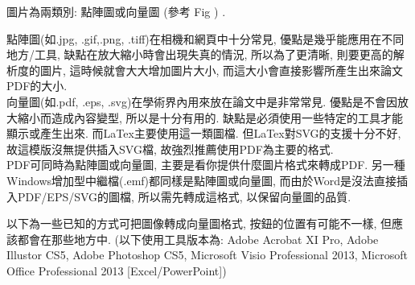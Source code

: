 

圖片為兩類別: 點陣圖或向量圖 (參考 Fig ) .\\


點陣圖(如.jpg, .gif,.png, .tiff)在相機和網頁中十分常見, 優點是幾乎能應用在不同地方/工具, 缺點在放大縮小時會出現失真的情況, 所以為了更清晰, 則要更高的解析度的圖片, 這時候就會大大增加圖片大小, 而這大小會直接影響所產生出來論文PDF的大小.\\

向量圖(如.pdf, .eps, .svg)在學術界內用來放在論文中是非常常見. 優點是不會因放大縮小而造成內容變型, 所以是十分有用的. 缺點是必須使用一些特定的工具才能顯示或產生出來. 而LaTex主要使用這一類圖檔. 但LaTex對SVG的支援十分不好, 故這模版沒無提供插入SVG檔, 故強烈推薦使用PDF為主要的格式.\\

PDF可同時為點陣圖或向量圖, 主要是看你提供什麼圖片格式來轉成PDF. 另一種Windows增加型中繼檔(.emf)都同樣是點陣圖或向量圖, 而由於Word是沒法直接插入PDF/EPS/SVG的圖檔, 所以需先轉成這格式, 以保留向量圖的品質.

\newpage
{}

以下為一些已知的方式可把圖像轉成向量圖格式, 按鈕的位置有可能不一樣, 但應該都會在那些地方中. (以下使用工具版本為: Adobe Acrobat XI Pro, Adobe Illustor CS5, Adobe Photoshop CS5, Microsoft Visio Professional 2013, Microsoft Office Professional 2013 [Excel/PowerPoint])

